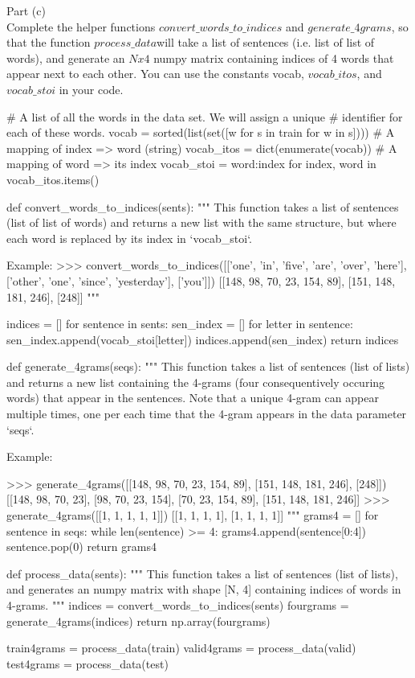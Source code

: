 \documentclass[12pt]{article}
\begin{document}
Part (c)\\
Complete the helper functions $convert\_words\_to\_indices$ and $generate\_4grams$, so that the function $process\_data$will take a list of sentences (i.e. list of list of words), and generate an  $Nx4$ numpy matrix containing indices of 4 words that appear next to each other. You can use the constants vocab, $vocab\_itos$, and $vocab\_stoi$ in your code.\\
\begin{python}
# A list of all the words in the data set. We will assign a unique 
# identifier for each of these words.
vocab = sorted(list(set([w for s in train for w in s])))
# A mapping of index => word (string)
vocab_itos = dict(enumerate(vocab))
# A mapping of word => its index
vocab_stoi = {word:index for index, word in vocab_itos.items()}

def convert_words_to_indices(sents):
    """
    This function takes a list of sentences (list of list of words)
    and returns a new list with the same structure, but where each word
    is replaced by its index in `vocab_stoi`.

    Example:
    >>> convert_words_to_indices([['one', 'in', 'five', 'are', 'over', 'here'],
                                  ['other', 'one', 'since', 'yesterday'],
                                  ['you']])
    [[148, 98, 70, 23, 154, 89], [151, 148, 181, 246], [248]]
    """

    indices = []
    for sentence in sents:
      sen_index = []
      for letter in sentence:
        sen_index.append(vocab_stoi[letter])
      indices.append(sen_index)
    return indices


def generate_4grams(seqs):
    """
    This function takes a list of sentences (list of lists) and returns
    a new list containing the 4-grams (four consequentively occuring words)
    that appear in the sentences. Note that a unique 4-gram can appear multiple
    times, one per each time that the 4-gram appears in the data parameter `seqs`.

    Example:

    >>> generate_4grams([[148, 98, 70, 23, 154, 89], [151, 148, 181, 246], [248]])
    [[148, 98, 70, 23], [98, 70, 23, 154], [70, 23, 154, 89], [151, 148, 181, 246]]
    >>> generate_4grams([[1, 1, 1, 1, 1]])
    [[1, 1, 1, 1], [1, 1, 1, 1]]
    """
    grams4 = []
    for sentence in seqs:
      while len(sentence) >= 4:
        grams4.append(sentence[0:4])
        sentence.pop(0)
    return grams4


def process_data(sents):
    """
    This function takes a list of sentences (list of lists), and generates an
    numpy matrix with shape [N, 4] containing indices of words in 4-grams.
    """
    indices = convert_words_to_indices(sents)
    fourgrams = generate_4grams(indices)
    return np.array(fourgrams)

train4grams = process_data(train)
valid4grams = process_data(valid)
test4grams = process_data(test)
\end{python}
\end{document}
